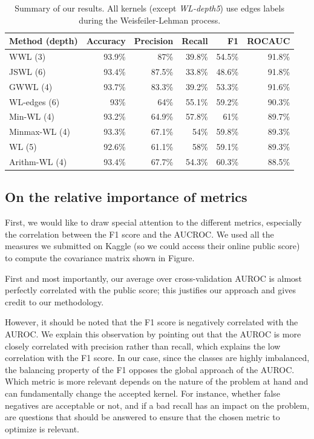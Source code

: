 \documentclass{IEEEtran}
\begin{document}
\begin{table}[htbp]
    \centering
    \begin{tabular}{l||rrrr|r}
        Method (depth) & Accuracy & Precision & Recall & F1     & ROCAUC \\
        \hline
        WWL (3)        & 93.9\%   & 87\%      & 39.8\% & 54.5\% & 91.8\% \\
        JSWL (6)       & 93.4\%   & 87.5\%    & 33.8\% & 48.6\% & 91.8\% \\
        GWWL (4)       & 93.7\%   & 83.3\%    & 39.2\% & 53.3\% & 91.6\% \\
        WL-edges (6)   & 93\%     & 64\%      & 55.1\% & 59.2\% & 90.3\% \\
        Min-WL (4)     & 93.2\%   & 64.9\%    & 57.8\% & 61\%   & 89.7\% \\
        Minmax-WL (4)  & 93.3\%   & 67.1\%    & 54\%   & 59.8\% & 89.3\% \\
        WL (5)         & 92.6\%   & 61.1\%    & 58\%   & 59.1\% & 89.3\% \\
        Arithm-WL (4)  & 93.4\%   & 67.7\%    & 54.3\% & 60.3\% & 88.5\% \\
    \end{tabular}
    \caption{Summary of our results. All kernels (except \emph{WL-depth5}) use edges labels during the Weisfeiler-Lehman process.}
    \label{tab:summary}
\end{table}

\subsection{On the relative importance of metrics}
First, we would like to draw special attention to the different metrics,
especially the correlation between the F1 score and the AUCROC.
We used all the measures we submitted on Kaggle
(so we could access their online public score)
to compute the covariance matrix shown in Figure.

First and most importantly,
our average over cross-validation AUROC is almost perfectly correlated with the public score;
this justifies our approach and gives credit to our methodology.

However, it should be noted that the F1 score is negatively correlated with the AUROC.
We explain this observation by pointing out that the AUROC is more closely correlated with precision rather than recall,
which explains the low correlation with the F1 score.
In our case, since the classes are highly imbalanced,
the balancing property of the F1 opposes the global approach of the AUROC.
Which metric is more relevant depends on the nature of the
problem at hand and can fundamentally change the accepted kernel.
For instance, whether false negatives are acceptable or not, and if a bad recall has an impact on the problem,
are questions that should be answered to ensure that the chosen metric to optimize is relevant.
\end{document}
